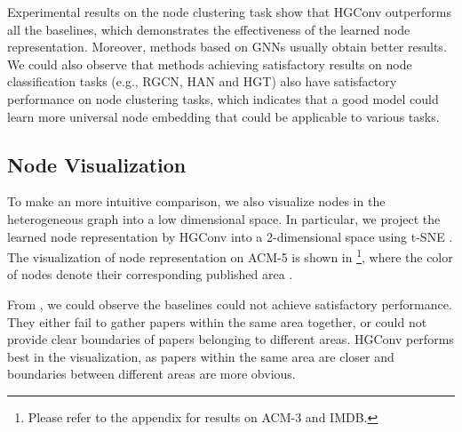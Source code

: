 Experimental results on the node clustering task show that HGConv outperforms all the baselines, which demonstrates the effectiveness of the learned node representation. Moreover, methods based on GNNs usually obtain better results.
We could also observe that methods achieving satisfactory results on node classification tasks (e.g., RGCN, HAN and HGT) also have satisfactory performance on node clustering tasks, which indicates that a good model could learn more universal node embedding that could be applicable to various tasks.

\subsection{Node Visualization}
To make an more intuitive comparison, we also visualize nodes in the heterogeneous graph into a low dimensional space. In particular, we project the learned node representation by HGConv into a 2-dimensional space using t-SNE \cite{maaten2008visualizing}. The visualization of node representation on ACM-5 is shown in  \footnote{Please refer to the appendix for results on ACM-3 and IMDB.}, where the color of nodes denote their corresponding published area .

From , we could observe the baselines could not achieve satisfactory performance. They either fail to gather papers within the same area together, or could not provide clear boundaries of papers belonging to different areas. HGConv performs best in the visualization, as papers within the same area are closer and boundaries between different areas are more obvious.

